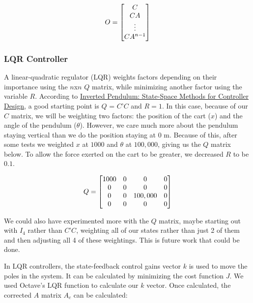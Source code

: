 \documentclass{article}
\begin{document}
 \begin{equation} 
\label{obsv}
\centering
O = \begin{bmatrix}
	C\\
	CA\\
	\vdots\\
	CA^{n-1}\\
	\end{bmatrix}
\end{equation}

\subsubsection{LQR Controller}
A linear-quadratic regulator (LQR) weights factors depending on their importance using the $n$x$n$ $Q$ matrix, while minimizing another factor using the variable $R$. According to \href{http://ctms.engin.umich.edu/CTMS/index.php?example=InvertedPendulum&section=ControlStateSpace}{Inverted Pendulum: State-Space Methods for Controller Design}, a good starting point is $Q$ = $C$'$C$ and $R = 1$. In this case, because of our $C$ matrix, we will be weighting two factors: the position of the cart ($x$) and the angle of the pendulum ($\theta$). However, we care much more about the pendulum staying vertical than we do the position staying at 0 m. Because of this, after some tests we weighted $x$ at $1000$ and $\theta$ at $100,000$, giving us the $Q$ matrix below. To allow the force exerted on the cart to be greater, we decreased $R$ to be $0.1$.

 \begin{equation} 
\label{q}
\centering
Q = \begin{bmatrix}
	1000&0&0&0\\
	0&0&0&0\\
	0&0&100,000&0\\
	0&0&0&0\\
	\end{bmatrix}
\end{equation}

We could also have experimented more with the $Q$ matrix, maybe starting out with $I_4$ rather than $C$'$C$, weighting all of our states rather than just 2 of them and then adjusting all 4 of these weightings. This is future work that could be done.

In LQR controllers, the state-feedback control gains vector $k$ is used to move the poles in the system. It can be calculated by minimizing the cost function $J$. We used Octave's LQR function to calculate our $k$ vector. Once calculated, the corrected $A$ matrix $A_c$ can be calculated:
\end{document}
